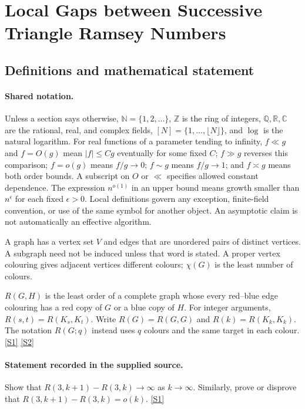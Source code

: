 \documentclass[11pt,a4paper]{article}
\newcommand{\N}{\mathbb{N}}
\newcommand{\Z}{\mathbb{Z}}
\newcommand{\Q}{\mathbb{Q}}
\newcommand{\R}{\mathbb{R}}
\newcommand{\C}{\mathbb{C}}
\newcommand{\sref}[2]{\hyperlink{source:#1:#2}{[S#2]}}
\begin{document}
\section{Local Gaps between Successive Triangle Ramsey Numbers}\label{statement}


\subsection{Definitions and mathematical statement}

\paragraph{Shared notation.}Unless a section says otherwise, $\N=\{1,2,\ldots\}$,
$\Z$ is the ring of integers, $\Q,\R,\C$ are the rational, real, and complex
fields, $[N]=\{1,\ldots,\lfloor N\rfloor\}$, and $\log$ is the natural
logarithm. For real functions of a parameter tending to infinity,
$f\ll g$ and $f=O(g)$ mean $|f|\leq Cg$ eventually for some fixed $C$;
$f\gg g$ reverses this comparison; $f=o(g)$ means $f/g\to0$;
$f\sim g$ means $f/g\to1$; and $f\asymp g$ means both order bounds.
A subscript on $O$ or $\ll$ specifies allowed constant dependence.
The expression $n^{o(1)}$ in an upper bound means growth smaller than
$n^\epsilon$ for each fixed $\epsilon>0$. Local definitions govern any
exception, finite-field convention, or use of the same symbol for another
object. An asymptotic claim is not automatically an effective algorithm.



A graph has a vertex set $V$ and edges that are unordered pairs of distinct vertices. A subgraph need not be induced unless that word is stated. A proper vertex colouring gives adjacent vertices different colours; $\chi(G)$ is the least number of colours.

$R(G,H)$ is the least order of a complete graph whose every red--blue edge colouring has a red copy of $G$ or a blue copy of $H$. For integer arguments, $R(s,t)=R(K_s,K_t)$. Write $R(G)=R(G,G)$ and $R(k)=R(K_k,K_k)$. The notation $R(G;q)$ instead uses $q$ colours and the same target in each colour. \sref{statement}{1} \sref{statement}{2}

\paragraph{Statement recorded in the supplied source.}
Show that $ R(3,k+1)-R(3,k)\to\infty $ as $k\to \infty$. Similarly, prove or disprove that $ R(3,k+1)-R(3,k)=o(k). $ \sref{statement}{1}
\end{document}
